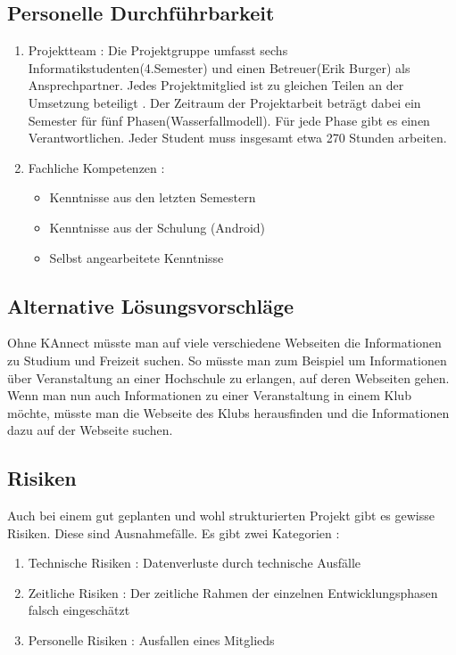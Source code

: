 \documentclass[parskip=full]{scrartcl}
\begin{document}
	\subsection{Personelle Durchführbarkeit}
	\begin{enumerate}[label={\alph*)}]
		\item Projektteam : Die Projektgruppe umfasst sechs Informatikstudenten(4.Semester) und einen Betreuer(Erik Burger) als Ansprechpartner.  Jedes Projektmitglied ist  zu gleichen Teilen an der Umsetzung beteiligt . Der Zeitraum der Projektarbeit beträgt dabei ein Semester für fünf Phasen(Wasserfallmodell). Für jede Phase gibt es einen  Verantwortlichen. Jeder  Student muss insgesamt etwa  270 Stunden arbeiten.
		\item Fachliche Kompetenzen : 
		\begin{itemize}
			\item Kenntnisse aus den letzten Semestern
			\item Kenntnisse aus der Schulung (Android)
			\item Selbst angearbeitete Kenntnisse
		\end{itemize}
	\end{enumerate}
	
	\subsection{Alternative Lösungsvorschläge}
Ohne KAnnect müsste man auf viele verschiedene Webseiten die Informationen zu Studium und Freizeit suchen. So müsste man zum Beispiel um Informationen über Veranstaltung an einer Hochschule zu erlangen, auf deren Webseiten gehen. Wenn man nun auch Informationen zu einer Veranstaltung in einem Klub möchte, müsste man die Webseite des Klubs herausfinden und die Informationen dazu auf der Webseite suchen.	

\newpage
	\subsection{Risiken} 
	Auch bei einem gut geplanten und wohl strukturierten Projekt gibt es gewisse Risiken. Diese sind Ausnahmefälle. Es gibt zwei \gls{Kategorie}n :
	\begin{enumerate}[label={\alph*)}]
		\item Technische Risiken : Datenverluste durch technische Ausfälle
		\item Zeitliche Risiken : Der zeitliche Rahmen der einzelnen Entwicklungsphasen falsch eingeschätzt
		\item Personelle Risiken : Ausfallen eines Mitglieds
	\end{enumerate}
	\newpage
	
	
	\printnoidxglossaries
	
\end{document}

